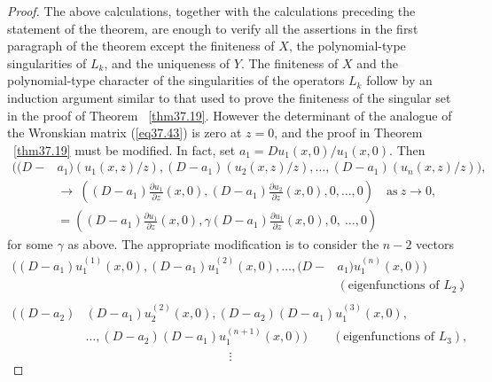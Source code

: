 \documentclass{surv-l}
\theoremstyle{plain}
\theoremstyle{definition}
\numberwithin{equation}{chapter}
\begin{document}
\begin{proof}
The above calculations, together with the calculations preceding the statement of the theorem, are enough to verify all the assertions in the first paragraph of the theorem except the finiteness of $X$, the polynomial-type singularities of $L_{k}$, and the uniqueness of $Y$. The finiteness of $X$ and the polynomial-type character of the singularities of the operators $L_{k}$ follow by an induction argument similar to that used to prove the finiteness of the singular set in the proof of Theorem ~\ref{thm37.19}. However the determinant of the analogue of the Wronskian matrix (\ref{eq37.43}) is zero at $z=0$, and the proof in Theorem ~\ref{thm37.19} must be modified. In fact, set $a_{1}=Du_{1}(x, 0)/u_{1}(x, 0)$. Then
\begin{align*}
((D-&a_{1})(u_{1} (x,z)/z), (D-a_{1})(u_{2}(x, z)/z),\ldots, (D-a_{1})(u_{n}(x, z)/z)),\\
&\rightarrow\ \left((D-a_{1})\frac{\partial u_{1}}{\partial z}(x, 0),(D-a_{1})\frac{\partial u_{2}}{\partial z}(x, 0),0,\ldots,0\right)\quad \text{as}\ z\rightarrow 0,\\
&=\left((D-a_{1})\frac{\partial u_{1}}{\partial z}(x, 0),\gamma(D-a_{1})\frac{\partial u_{1}}{\partial z}(x, 0),0,\ \ldots,0\right)
\end{align*}
for some $\gamma$ as above. The appropriate modification is to consider the $n-2$ vectors
\begin{align*}
((D-a_{1})u_{1}^{(1)}(x, 0),(D-a_{1})u_{1}^{(2)}(x,0), \ldots, (D-&a_{1})u_{1}^{(n)}(x, 0))\\
&(\text{eigenfunctions of } L_{2}),\\
\end{align*}
\begin{align*}
((D-a_{2})&(D-a_{1})u_{2}^{(2)}(x, 0),(D-a_{2})(D-a_{1})u_{1}^{(3)}(x,0),\\
&\ldots, (D-a_{2})(D-a_{1})u_{1}^{(n+1)}(x, 0))\qquad (\text{eigenfunctions of } L_{3}),\\
\end{align*}
\begin{equation*}
\vdots
\end{equation*}
\end{proof}
\end{document}
